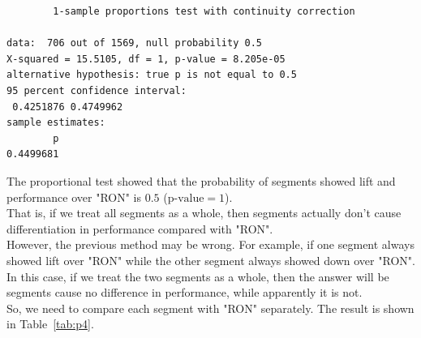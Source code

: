 \documentclass[12pt]{article}
\begin{document}
\begin{verbatim}
        1-sample proportions test with continuity correction

data:  706 out of 1569, null probability 0.5
X-squared = 15.5105, df = 1, p-value = 8.205e-05
alternative hypothesis: true p is not equal to 0.5
95 percent confidence interval:
 0.4251876 0.4749962
sample estimates:
        p
0.4499681
\end{verbatim}

The proportional test showed that the probability of segments showed lift and performance over "RON" is $0.5$ ($\text{p-value} = 1$). \\

That is, if we treat all segments as a whole, then segments actually don't cause differentiation in performance compared with "RON". \\

However, the previous method may be wrong. For example, if one segment always showed lift over "RON" while the other segment always showed down over "RON". In this case, if we treat the two segments as a whole, then the answer will be segments cause no difference in performance, while apparently it is not. \\

So, we need to compare each segment with "RON" separately. The result is shown in Table~\ref{tab:p4}. \\
\end{document}
